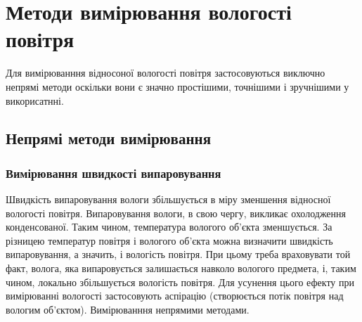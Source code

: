 \chapter{Методи вимірювання вологості повітря}

Для вимірюванння відносоної вологості повітря застосовуються виключно непрямі методи оскільки вони є
значно простішими, точнішими і зручнішими у викорисатнні.

\section{Непрямі методи вимірювання}

\subsection{Вимірювання швидкості випаровування}

Швидкість випаровування вологи збільшується в міру зменшення відносної вологості повітря.
Випаровування вологи, в свою чергу, викликає охолодження конденсованої. Таким чином, температура
вологого об'єкта зменшується. За різницею температур повітря і вологого об'єкта можна визначити
швидкість випаровування, а значить, і вологість повітря. При цьому треба враховувати той факт,
волога, яка випаровується залишається навколо вологого предмета, і, таким чином, локально
збільшується вологість повітря. Для усунення цього ефекту при вимірюванні вологості застосовують
аспірацію (створюється потік повітря над вологим об'єктом). Вимірюванння непрямими методами.
